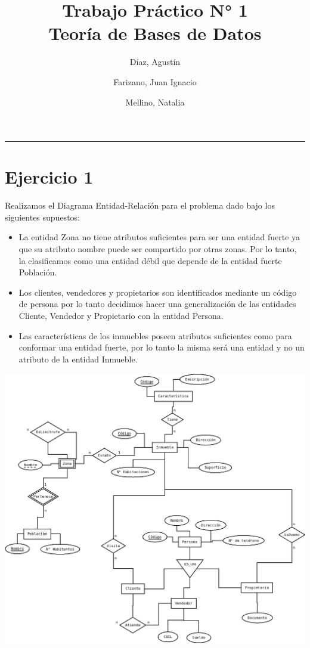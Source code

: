 \documentclass[11pt, fleqn]{article}
\title{%
    Trabajo Práctico N° 1 \\
    \large Teoría de Bases de Datos}
\author{Díaz, Agustín \and Farizano, Juan Ignacio \and Mellino, Natalia} %
\date{}
\begin{document}
\maketitle
\noindent\rule{\textwidth}{1pt}

\section*{Ejercicio 1}

Realizamos el Diagrama Entidad-Relación para el problema dado bajo los siguientes supuestos: 

\begin{itemize} %
    \item La entidad Zona no tiene atributos suficientes para ser una entidad fuerte
          ya que su atributo nombre puede ser compartido por otras zonas. Por lo tanto, 
          la clasificamos como una entidad débil que depende de la entidad fuerte Población.
    \item Los clientes, vendedores y propietarios son identificados mediante un código de persona
          por lo tanto decidimos hacer una generalización de las entidades
          Cliente, Vendedor y Propietario con la entidad Persona.
    \item Las características de los inmuebles poseen atributos suficientes como para conformar una
          entidad fuerte, por lo tanto la misma será una entidad y no un atributo de la entidad Inmueble. 
\end{itemize}

\includegraphics[width=15cm, height=12cm]{DER.png}
\end{document}
